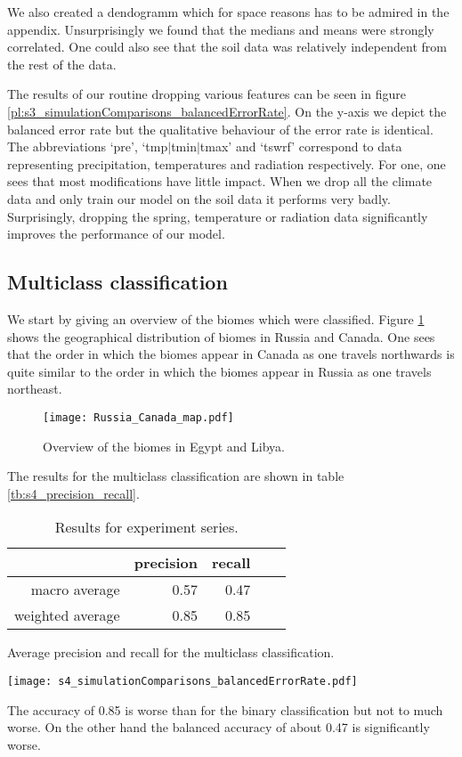We also created a dendogramm which for space reasons has to be admired in the appendix.
Unsurprisingly we found that the medians and means were strongly correlated. One could also see that the 
soil data was relatively independent from the rest of the data.

The results of our routine dropping various features can
be seen in figure \ref{pl:s3_simulationComparisons_balancedErrorRate}.
On the y-axis we depict the balanced error rate but the qualitative behaviour of the error rate is identical.
The abbreviations `pre', `tmp$|$tmin$|$tmax' and `tswrf' correspond to data representing
precipitation, temperatures and radiation respectively.
For one, one sees that most modifications have little impact.
When we drop all the climate data and only train our model on the soil data it performs very badly.
Surprisingly, dropping the spring, temperature or radiation data
significantly improves the performance of our model.


\subsection{Multiclass classification}

We start by giving an overview of the biomes which were classified. Figure \ref{pl:Russia_Canada_map}
shows the geographical distribution of biomes in Russia and Canada. One sees that the order in which the
biomes appear in Canada as one travels northwards is quite similar to the order in which the biomes appear in
Russia as one travels northeast.
\begin{figure}
  \centering
  \texttt{[image: Russia\_Canada\_map.pdf]}
  \caption{Overview of the biomes in Egypt and Libya.}
  \label{pl:Russia_Canada_map}
\end{figure}
The results for the multiclass classification are shown in table \ref{tb:s4_precision_recall}.
\begin{table}
  \centering
  \begin{minipage}{0.45\textwidth}
    
  \begin{tabular}{rrrrr}
    \toprule
     & precision & recall \\
    \midrule
    macro average & 0.57 & 0.47 \\
    weighted average & 0.85 & 0.85 \\
    \bottomrule
    \end{tabular}
    \caption{Average precision and recall for the multiclass classification.}
    \label{tb:s4_precision_recall}
  \end{minipage}
  \hfill
  \begin{minipage}{0.45\textwidth}
    \centering
    \texttt{[image: s4\_simulationComparisons\_balancedErrorRate.pdf]}
    \caption{Results for experiment series.}
    \label{pl:s4_simulationComparisons_balancedErrorRate}
  \end{minipage}
\end{table}
The accuracy of 0.85 is worse than for the binary classification but not to much worse.
On the other hand the balanced accuracy of about 0.47 is significantly worse.

